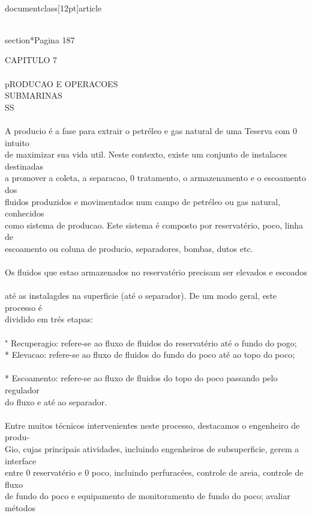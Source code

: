 \\documentclass[12pt]{article}
\begin{document}
\\section*{Pagina 187}

CAPITULO 7\\
\\
pRODUCAO E OPERACOES\\
SUBMARINAS\\
SS\\
\\
A producio é a fase para extrair o petréleo e gas natural de uma Teserva com 0 intuito\\
de maximizar sua vida util. Neste contexto, existe um conjunto de instalaces destinadas\\
a promover a coleta, a separacao, 0 tratamento, o armazenamento e o escoamento dos\\
fluidos produzidos e movimentados num campo de petréleo ou gas natural, conhecidos\\
como sistema de producao. Este sistema é composto por reservatério, poco, linha de\\
escoamento ou coluna de producio, separadores, bombas, dutos etc.\\
\\
Os fluidos que estao armazenados no reservatério precisam ser elevados e escoados\\
\\
até as instalagdes na superficie (até o separador). De um modo geral, este processo é\\
dividido em trés etapas:\\
\\
" Recuperagio: refere-se ao fluxo de fluidos do reservatério até o fundo do pogo;\\
* Elevacao: refere-se ao fluxo de fluidos do fundo do poco até ao topo do poco;\\
\\
* Escoamento: refere-se ao fluxo de fluidos do topo do poco passando pelo regulador\\
do fluxo e até ao separador.\\
\\
Entre muitos técnicos intervenientes neste processo, destacamos o engenheiro de produ-\\
Gio, cujas principais atividades, incluindo engenheiros de subsuperficie, gerem a interface\\
entre 0 reservatério e 0 poco, incluindo perfuracées, controle de areia, controle de fluxo\\
de fundo do poco e equipamento de monitoramento de fundo do poco; avaliar métodos\\
\end{document}
